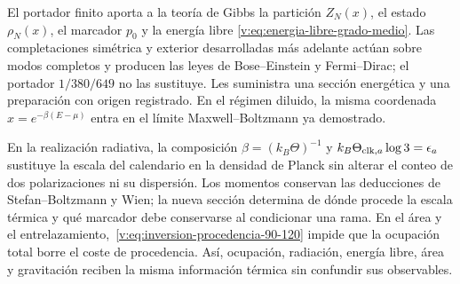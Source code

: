 El portador finito aporta a la teoría de Gibbs la partición
$Z_N(x)$, el estado $\rho_N(x)$, el marcador $p_0$ y la energía libre
\eqref{v:eq:energia-libre-grado-medio}. Las completaciones simétrica y
exterior desarrolladas más adelante actúan sobre modos completos y producen
las leyes de Bose--Einstein y Fermi--Dirac; el portador $1/380/649$ no las
sustituye. Les suministra una sección energética y una preparación con origen
registrado. En el régimen diluido, la misma coordenada
$x=e^{-\beta(E-\mu)}$ entra en el límite Maxwell--Boltzmann ya demostrado.

En la realización radiativa, la composición
$\beta=(k_B\Theta)^{-1}$ y
$k_B\Theta_{{\rm clk},a}\log3=\epsilon_a$ sustituye la escala del calendario
en la densidad de Planck sin alterar el conteo de dos polarizaciones ni su
dispersión. Los momentos conservan las deducciones de Stefan--Boltzmann y
Wien; la nueva sección determina de dónde procede la escala térmica y qué
marcador debe conservarse al condicionar una rama. En el área y el
entrelazamiento,~\eqref{v:eq:inversion-procedencia-90-120} impide que la
ocupación total borre el coste de procedencia. Así, ocupación, radiación,
energía libre, área y gravitación reciben la misma información térmica sin
confundir sus observables.
